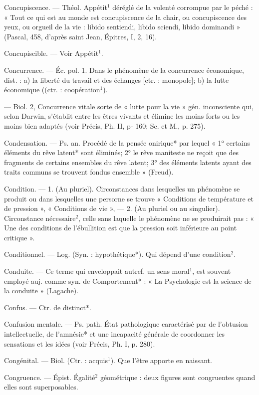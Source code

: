Concupiscence. — Théol. Appétit$^1$ déréglé de la volenté corrompue par
le péché : « Tout ce qui est au
monde est concupiscence de la chair,
ou concupiscence des yeux, ou
orgueil de la vie : libido sentiendi,
libido sciendi, libido dominandi »
(Pascal, 458, d’après saint Jean,
Épitres, I, 2, 16).

Concupiscible. — Voir Appétit$^1$.

Concurrence. — Éc. pol. 1. Dans le
phénomène de la concurrence économique, dist. : a) la liberté du travail
et des échanges [ctr. : monopole];
b) la lutte économique ((ctr. : coopération$^1$).

— Biol. 2, Concurrence vitale
sorte de « lutte pour la vie » gén.
inconsciente qui, selon Darwin,
s'établit entre les êtres vivants et
élimine les moins forts ou les moins
bien adaptés (voir Précis, Ph. II,
p- 160; Sc. et M., p. 275).

Condensation. — Ps. an. Procédé de
la pensée onirique* par lequel
« 1° certains éléments du rêve latent*
sont éliminés; 2° le rêve maniteste
ne reçoit que des fragments de certains ensembles du rêve latent;
3° des éléments latents ayant des
traits communs se trouvent fondus
ensemble » (Freud).

Condition. — 1. (Au pluriel). Circonstances dans lesquelles un phénomène se produit ou dans lesquelles une persorne se trouve
« Conditions de température et de
pression », « Conditions de vie », —
2. (Au pluriel ou au singulier). Circonstance nécessaire$^2$, celle sans
laquelle le phénomène ne se produirait
pas : « Une des conditions de
l'ébullition est que la pression soit
inférieure au point critique ».

Conditionnel. — Log. (Syn. : hypothétique*). Qui dépend d'une condition$^2$.

Conduite. — Ce terme qui enveloppait
autref. un sens moral$^1$, est souvent
employé auj. comme syn. de Comportement* : « La Psychologie est la
science de la conduite » (Lagache).

Confus. — Ctr. de distinct*.

Confusion mentale. — Ps. path. État
pathologique caractérisé par de
l’obtusion intellectuelle, de l’amnésie* et une incapacité générale de
coordonner les sensations et les
idées (voir Précis, Ph. I, p. 280).

Congénital. — Biol. (Ctr. : acquis$^1$).
Que l’être apporte en naissant.

Congruence. — Épist. Égalité$^2$ géométrique : deux figures sont congruentes quand elles sont superposables.

